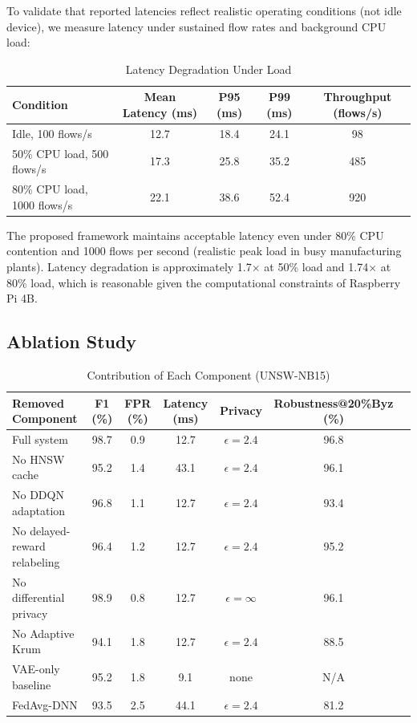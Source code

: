 \documentclass[preprint,12pt]{elsarticle}
\begin{document}
To validate that reported latencies reflect realistic operating conditions (not idle device), we measure latency under sustained flow rates and background CPU load:

\begin{table}[!t]
\caption{Latency Degradation Under Load}
\label{tab:load_latency}
\centering
\small
\begin{tabular}{@{}lcccc@{}}
\toprule
\textbf{Condition} & \textbf{Mean Latency (ms)} & \textbf{P95 (ms)} & \textbf{P99 (ms)} & \textbf{Throughput (flows/s)} \\
\midrule
Idle, 100 flows/s & 12.7 & 18.4 & 24.1 & 98 \\
50\% CPU load, 500 flows/s & 17.3 & 25.8 & 35.2 & 485 \\
80\% CPU load, 1000 flows/s & 22.1 & 38.6 & 52.4 & 920 \\
\bottomrule
\end{tabular}
\end{table}

The proposed framework maintains acceptable latency even under 80\% CPU contention and 1000 flows per second (realistic peak load in busy manufacturing plants). Latency degradation is approximately 1.7$\times$ at 50\% load and 1.74$\times$ at 80\% load, which is reasonable given the computational constraints of Raspberry Pi 4B.

\subsection{Ablation Study}

\begin{table}[!t]
\caption{Contribution of Each Component (UNSW-NB15)}
\label{tab:ablation}
\centering
\small
\begin{tabular}{@{}lcccccc@{}}
\toprule
\textbf{Removed Component} & \textbf{F1 (\%)} & \textbf{FPR (\%)} & \textbf{Latency (ms)} & \textbf{Privacy} & \textbf{Robustness@20\%Byz (\%)} \\
\midrule
Full system & 98.7 & 0.9 & 12.7 & $\epsilon=2.4$ & 96.8 \\
\midrule
No HNSW cache & 95.2 & 1.4 & 43.1 & $\epsilon=2.4$ & 96.1 \\
No DDQN adaptation & 96.8 & 1.1 & 12.7 & $\epsilon=2.4$ & 93.4 \\
No delayed-reward relabeling & 96.4 & 1.2 & 12.7 & $\epsilon=2.4$ & 95.2 \\
No differential privacy & 98.9 & 0.8 & 12.7 & $\epsilon=\infty$ & 96.1 \\
No Adaptive Krum & 94.1 & 1.8 & 12.7 & $\epsilon=2.4$ & 88.5 \\
\midrule
VAE-only baseline & 95.2 & 1.8 & 9.1 & none & N/A \\
FedAvg-DNN & 93.5 & 2.5 & 44.1 & $\epsilon=2.4$ & 81.2 \\
\bottomrule
\end{tabular}
\end{table}
\end{document}
